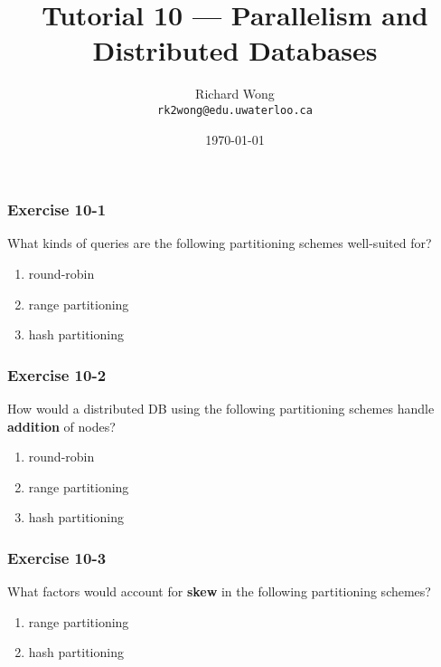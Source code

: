 

\def\ojoin{\setbox0=\hbox{$\bowtie$}%
  \rule[-.02ex]{.25em}{.4pt}\llap{\rule[\ht0]{.25em}{.4pt}}}
\def\leftouterjoin{\mathbin{\ojoin\mkern-5.8mu\bowtie}}

\title{Tutorial 10 --- Parallelism and Distributed Databases }

\author{Richard Wong \\ \small \texttt{rk2wong@edu.uwaterloo.ca}}
\date{\today}




\begin{frame}
  \titlepage

\end{frame}


\begin{frame}
\frametitle{Exercise 10-1}

What kinds of queries are the following partitioning schemes well-suited for?

\begin{enumerate}
  \item round-robin
  \item range partitioning
  \item hash partitioning
\end{enumerate}

\end{frame}


\begin{frame}
\frametitle{Exercise 10-2}

How would a distributed DB using the following partitioning schemes handle \textbf{addition} of nodes?

\begin{enumerate}
  \item round-robin
  \item range partitioning
  \item hash partitioning
\end{enumerate}

\end{frame}


\begin{frame}
\frametitle{Exercise 10-3}

What factors would account for \textbf{skew} in the following partitioning schemes?

\begin{enumerate}
  \item range partitioning
  \item hash partitioning
\end{enumerate}

\end{frame}


